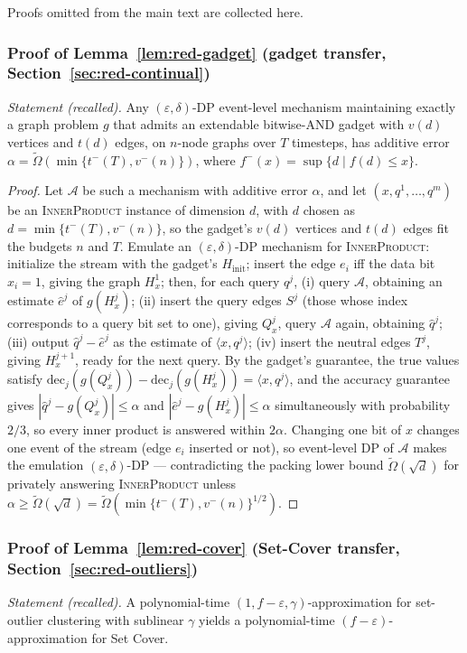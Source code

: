 Proofs omitted from the main text are collected here.

\subsubsection*{Proof of Lemma~\ref{lem:red-gadget} (gadget transfer,
Section~\ref{sec:red-continual})}
{\itshape Statement (recalled).} Any $(\varepsilon, \delta)$-DP event-level mechanism
maintaining exactly a graph problem $g$ that admits an extendable bitwise-AND gadget
with $v(d)$ vertices and $t(d)$ edges, on $n$-node graphs over $T$ timesteps, has
additive error $\alpha = \widetilde{\Omega}(\min\{t^{-}(T), v^{-}(n)\})$, where
$f^{-}(x) = \sup\{d \mid f(d) \le x\}$.\eop

\begin{proof}
Let $\mathcal{A}$ be such a mechanism with additive error $\alpha$, and let
$(x, q^1, \dots, q^m)$ be an \textsc{InnerProduct} instance of dimension $d$, with
$d$ chosen as $d = \min\{t^{-}(T), v^{-}(n)\}$, so the gadget's $v(d)$ vertices and
$t(d)$ edges fit the budgets $n$ and $T$. Emulate an $(\varepsilon,\delta)$-DP
mechanism for \textsc{InnerProduct}: initialize the stream with the gadget's
$H_{\mathrm{init}}$; insert the edge $e_i$ iff the data bit $x_i = 1$, giving the
graph $H_x^1$; then, for each query $q^j$, (i) query $\mathcal{A}$, obtaining an
estimate $\hat e^j$ of $g(H_x^j)$; (ii) insert the query edges $S^j$ (those whose
index corresponds to a query bit set to one), giving $Q_x^j$, query $\mathcal{A}$
again, obtaining $\hat q^j$; (iii) output $\hat q^j - \hat e^j$ as the estimate of
$\langle x, q^j \rangle$; (iv) insert the neutral edges $T^j$, giving $H_x^{j+1}$,
ready for the next query. By the gadget's guarantee, the true values satisfy
$\mathrm{dec}_j(g(Q_x^j)) - \mathrm{dec}_j(g(H_x^j)) = \langle x, q^j \rangle$, and
the accuracy guarantee gives $|\hat q^j - g(Q_x^j)| \le \alpha$ and
$|\hat e^j - g(H_x^j)| \le \alpha$ simultaneously with probability $2/3$, so every
inner product is answered within $2\alpha$. Changing one bit of $x$ changes one event
of the stream (edge $e_i$ inserted or not), so event-level DP of $\mathcal{A}$ makes
the emulation $(\varepsilon,\delta)$-DP --- contradicting the packing lower bound
$\widetilde{\Omega}(\sqrt{d})$ for privately answering \textsc{InnerProduct} unless
$\alpha \ge \widetilde{\Omega}(\sqrt{d}) = \widetilde{\Omega}(\min\{t^{-}(T),
v^{-}(n)\}^{1/2})$.
\end{proof}

\subsubsection*{Proof of Lemma~\ref{lem:red-cover} (Set-Cover transfer,
Section~\ref{sec:red-outliers})}
{\itshape Statement (recalled).} A polynomial-time $(1, f-\varepsilon,
\gamma)$-approximation for set-outlier clustering with sublinear $\gamma$ yields a
polynomial-time $(f-\varepsilon)$-approximation for Set Cover.\eop

